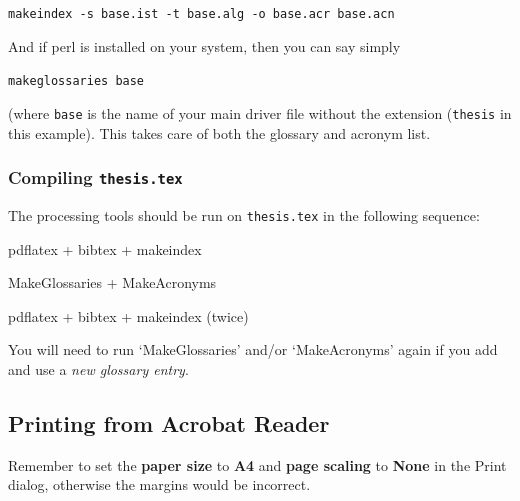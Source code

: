 \documentclass[a4paper,12pt]{scrartcl}
\begin{document}
\hspace{1em}\texttt{makeindex -s \textlangle base\textrangle.ist -t \textlangle base\textrangle.alg -o \textlangle base\textrangle.acr \textlangle base\textrangle.acn}

\medskip


And if perl is installed on your system, then you can say simply 
\medskip

\hspace{1em}\texttt{makeglossaries \textlangle base\textrangle}

\medskip

\noindent(where \texttt{\textlangle base\textrangle} is the name of your main driver file without the extension (\texttt{thesis} in this example). This takes care of both the glossary and acronym list.


\subsubsection{Compiling \texttt{thesis.tex}}
The processing tools should be run on \texttt{thesis.tex} in the following sequence:
\begin{compactenum}
\item pdflatex + bibtex + makeindex
\item MakeGlossaries + MakeAcronyms
\item pdflatex + bibtex + makeindex (twice)
\end{compactenum}

You will need to run `\textsf{MakeGlossaries}' and/or `\textsf{MakeAcronyms}' again if you add and use a \emph{new glossary entry}.


\subsection{Printing from Acrobat Reader}
Remember to set the \textbf{paper size} to \textbf{A4} and \textbf{page scaling} to \textbf{None} in the \textsf{Print} dialog, otherwise the margins would be incorrect.
\end{document}

